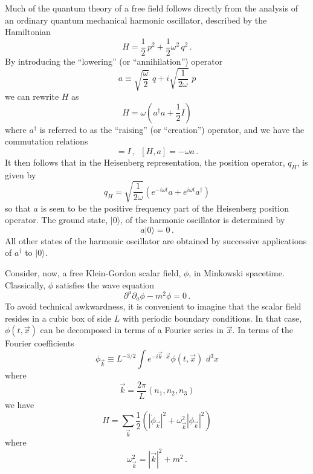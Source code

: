 \documentclass[12pt,epsf,amsfonts,amssymb]{article}
\begin{document}
Much of the quantum theory of a free field follows directly from the
analysis of an ordinary quantum mechanical harmonic oscillator,
described by the Hamiltonian
\begin{equation}
H = \frac{1}{2} \, p^2 + \frac{1}{2} \omega^2 \, q^2 \, .
\end{equation}
By introducing the ``lowering'' (or ``annihilation'') operator
\begin{equation}
a \equiv \sqrt{\frac{\omega}{2}} \,\, q + i \sqrt{\frac{1}{2\omega}} \,\, p
\end{equation}
we can rewrite $H$ as
\begin{equation}
H = \omega (a^\dagger a + \frac{1}{2} I)
\end{equation}
where $a^\dagger$ is referred to as the ``raising'' (or ``creation'')
operator, and we have the commutation relations 
\begin{equation}
[a, a^\dagger] = I \, , \,\,\, [H,a] = - \omega a \, .
\end{equation}
It then follows that in the Heisenberg representation, the position
operator, $q_H$, is given by
\begin{equation}
q_H = \sqrt{\frac{1}{2\omega}} \left(e^{-i\omega t} a 
+ e^{i\omega t} a^\dagger \right)
\end{equation}
so that $a$ is seen to be the positive frequency part of the
Heisenberg position operator. The ground state, $|0 \rangle$, of the harmonic
oscillator is determined by
\begin{equation}
a |0 \rangle = 0 \, .
\end{equation}
All other states of the harmonic oscillator are obtained by successive
applications of $a^\dagger$ to $|0 \rangle$.

Consider, now, a free Klein-Gordon scalar field, $\phi$, in Minkowski
spacetime. Classically, $\phi$ satisfies the wave equation
\begin{equation}
\partial^a \partial_a \phi - m^2 \phi = 0 \, .
\end{equation}
To avoid technical awkwardness, it is convenient to imagine that the
scalar field resides in a cubic box of side $L$ with periodic boundary
conditions. In that case, $\phi(t, \vec{x})$ can be decomposed in
terms of a Fourier series in $\vec{x}$. In terms of the Fourier coefficients
\begin{equation}
\phi_{\vec{k}} \equiv L^{-3/2} \int 
e^{-i\vec{k} \cdot \vec{x}} \phi(t, \vec{x}) \,\, d^3 x
\end{equation}
where 
\begin{equation}
\vec{k} = \frac{2 \pi}{L} (n_1, n_2, n_3)
\end{equation}
we have
\begin{equation}
H = \sum_{\vec{k}} \frac{1}{2} \left(|\dot{\phi}_{\vec{k}}|^2 
+ \omega^2_{\vec{k}} |\phi_{\vec{k}}|^2 \right)
\end{equation}
where
\begin{equation}
\omega^2_{\vec{k}} = |\vec{k}|^2 + m^2 \, .
\end{equation}
\end{document}
